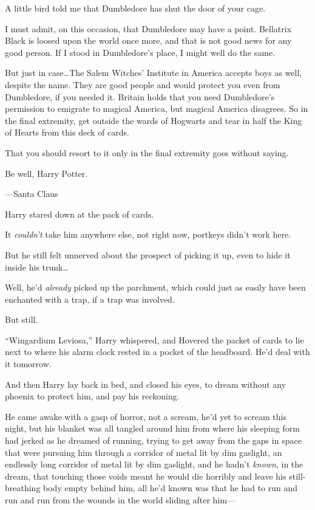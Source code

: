 \begin{writtenNote}
A little bird told me that Dumbledore has shut the door of your cage.

I must admit, on this occasion, that Dumbledore may have a point. Bellatrix Black is loosed upon the world once more, and that is not good news for any good person. If I stood in Dumbledore’s place, I might well do the same.

But just in case…The Salem Witches’ Institute in America accepts boys as well, despite the name. They are good people and would protect you even from Dumbledore, if you needed it. Britain holds that you need Dumbledore’s permission to emigrate to magical America, but magical America disagrees. So in the final extremity, get outside the wards of Hogwarts and tear in half the King of Hearts from this deck of cards.

That you should resort to it only in the final extremity goes without saying.

Be well, Harry Potter.

—Santa Claus
\end{writtenNote}

Harry stared down at the pack of cards.

It \emph{couldn’t} take him anywhere else, not right now, portkeys didn’t work here.

But he still felt unnerved about the prospect of picking it up, even to hide it inside his trunk…

Well, he’d \emph{already} picked up the parchment, which could just as easily have been enchanted with a trap, if a trap was involved.

But still.

“Wingardium Leviosa,” Harry whispered, and Hovered the packet of cards to lie next to where his alarm clock rested in a pocket of the headboard. He’d deal with it tomorrow.

And then Harry lay back in bed, and closed his eyes, to dream without any phoenix to protect him, and pay his reckoning.

\later

He came awake with a gasp of horror, not a scream, he’d yet to scream this night, but his blanket was all tangled around him from where his sleeping form had jerked as he dreamed of running, trying to get away from the gaps in space that were pursuing him through a corridor of metal lit by dim gaslight, an endlessly long corridor of metal lit by dim gaslight, and he hadn’t \emph{known}, in the dream, that touching those voids meant he would die horribly and leave his still-breathing body empty behind him, all he’d known was that he had to run and run and run from the wounds in the world sliding after him—

